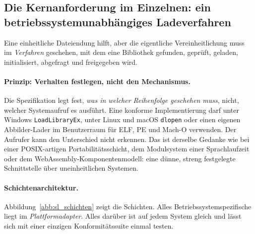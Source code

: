 \subsection{Die Kernanforderung im Einzelnen: ein betriebssystemunabhängiges Ladeverfahren}
\label{sec:sl_kern}

Eine einheitliche Dateiendung hilft, aber die eigentliche Vereinheitlichung muss im \emph{Verfahren} geschehen, mit dem eine Bibliothek gefunden, geprüft, geladen, initialisiert, abgefragt und freigegeben wird.

\paragraph{Prinzip: Verhalten festlegen, nicht den Mechanismus.} Die Spezifikation legt fest, \emph{was in welcher Reihenfolge geschehen muss}, nicht, welcher Systemaufruf es ausführt. Eine konforme Implementierung darf unter Windows \texttt{LoadLibraryEx}, unter Linux und macOS \texttt{dlopen} oder einen eigenen Abbilder-Lader im Benutzerraum für ELF, PE und Mach-O verwenden. Der Aufrufer kann den Unterschied nicht erkennen. Das ist derselbe Gedanke wie bei einer POSIX-artigen Portabilitätsschicht, dem Modulsystem einer Sprachlaufzeit oder dem WebAssembly-Komponentenmodell: eine dünne, streng festgelegte Schnittstelle über uneinheitlichen Systemen.

\paragraph{Schichtenarchitektur.} Abbildung~\ref{abb:sl_schichten} zeigt die Schichten. Alles Betriebssystemspezifische liegt im \emph{Plattformadapter}. Alles darüber ist auf jedem System gleich und lässt sich mit einer einzigen Konformitätssuite einmal testen.


